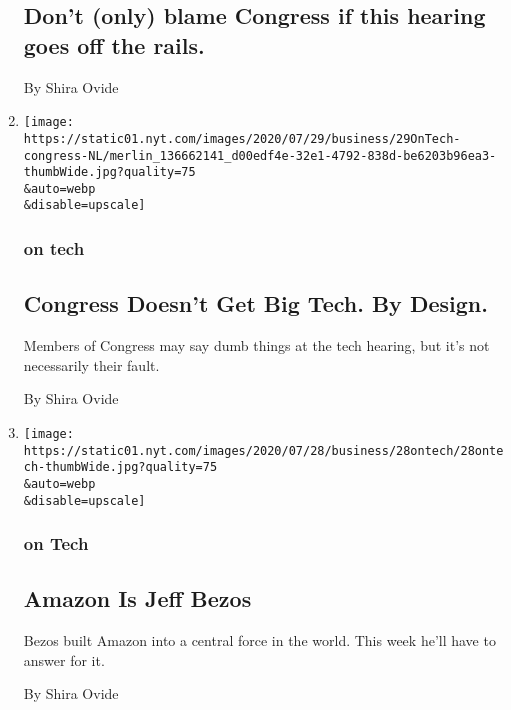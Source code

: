 \begin{enumerate}
{  \subsection{Don't (only) blame Congress if this hearing goes off the
  rails.}\label{dont-only-blame-congress-if-this-hearing-goes-off-the-rails}}

  By Shira Ovide
\item
  \href{/2020/07/29/technology/congress-big-tech.html}{}

  \texttt{[image: https://static01.nyt.com/images/2020/07/29/business/29OnTech-congress-NL/merlin\_136662141\_d00edf4e-32e1-4792-838d-be6203b96ea3-thumbWide.jpg?quality=75\\\&auto=webp\\\&disable=upscale]}

  \hypertarget{on-tech-7}{%
  \subsubsection{on tech}\label{on-tech-7}}

  \hypertarget{congress-doesnt-get-big-tech-by-design}{%
  \subsection{Congress Doesn't Get Big Tech. By
  Design.}\label{congress-doesnt-get-big-tech-by-design}}

  Members of Congress may say dumb things at the tech hearing, but it's
  not necessarily their fault.

  By Shira Ovide
\item
  \href{/2020/07/28/technology/amazon-jeff-bezos.html}{}

  \texttt{[image: https://static01.nyt.com/images/2020/07/28/business/28ontech/28ontech-thumbWide.jpg?quality=75\\\&auto=webp\\\&disable=upscale]}

  \hypertarget{on-tech-8}{%
  \subsubsection{on Tech}\label{on-tech-8}}

  \hypertarget{amazon-is-jeff-bezos}{%
  \subsection{Amazon Is Jeff Bezos}\label{amazon-is-jeff-bezos}}

  Bezos built Amazon into a central force in the world. This week he'll
  have to answer for it.

  By Shira Ovide
\end{enumerate}

